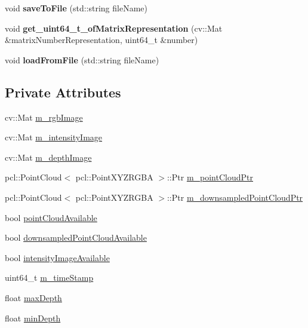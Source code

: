 \begin{DoxyCompactItemize}
\item 
\hypertarget{class_c_frame_r_g_b_d_aa06519642bbec944c008786c6d5a21aa}{
void {\bfseries saveToFile} (std::string fileName)}
\label{class_c_frame_r_g_b_d_aa06519642bbec944c008786c6d5a21aa}

\item 
\hypertarget{class_c_frame_r_g_b_d_a7312a178f68d3a0e8a864404805bcfde}{
void {\bfseries get\_\-uint64\_\-t\_\-ofMatrixRepresentation} (cv::Mat \&matrixNumberRepresentation, uint64\_\-t \&number)}
\label{class_c_frame_r_g_b_d_a7312a178f68d3a0e8a864404805bcfde}

\item 
\hypertarget{class_c_frame_r_g_b_d_af3a2aa2e5662f6c497814e99b2cbc13b}{
void {\bfseries loadFromFile} (std::string fileName)}
\label{class_c_frame_r_g_b_d_af3a2aa2e5662f6c497814e99b2cbc13b}

\end{DoxyCompactItemize}
\subsection*{Private Attributes}
\begin{DoxyCompactItemize}
\item 
cv::Mat \hyperlink{class_c_frame_r_g_b_d_aaaa8d12b6df4db4a2a2e050d6894fa64}{m\_\-rgbImage}
\item 
cv::Mat \hyperlink{class_c_frame_r_g_b_d_a4267ae0f2e87e7f1b8faccce68ffecd3}{m\_\-intensityImage}
\item 
cv::Mat \hyperlink{class_c_frame_r_g_b_d_a1dbfcec74d90c8cc98018a9f0df6c708}{m\_\-depthImage}
\item 
pcl::PointCloud$<$ pcl::PointXYZRGBA $>$::Ptr \hyperlink{class_c_frame_r_g_b_d_a72e3371759953f15c7bb6637bc6d8ab4}{m\_\-pointCloudPtr}
\item 
pcl::PointCloud$<$ pcl::PointXYZRGBA $>$::Ptr \hyperlink{class_c_frame_r_g_b_d_aaff14ee9689f9d2d895300e5236be6d0}{m\_\-downsampledPointCloudPtr}
\item 
bool \hyperlink{class_c_frame_r_g_b_d_ace30426f416cd66b2a0a256071d93464}{pointCloudAvailable}
\item 
bool \hyperlink{class_c_frame_r_g_b_d_a06f87da2b36ef01b47ac338adb6443ea}{downsampledPointCloudAvailable}
\item 
bool \hyperlink{class_c_frame_r_g_b_d_a445d7d67bbff8cdac482e1c10dba2dc9}{intensityImageAvailable}
\item 
uint64\_\-t \hyperlink{class_c_frame_r_g_b_d_a0f7c2fb4831a936c63b78305ab9298bd}{m\_\-timeStamp}
\item 
float \hyperlink{class_c_frame_r_g_b_d_abc84822b1baf13e257826ffb219dd913}{maxDepth}
\item 
float \hyperlink{class_c_frame_r_g_b_d_aaaab590488c350a37cba25c54ff2519c}{minDepth}
\end{DoxyCompactItemize}


